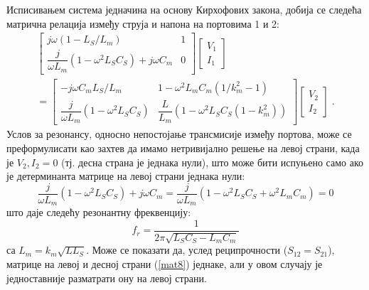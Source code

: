 \documentclass[main.tex]{subfiles}
\begin{document}
Исписивањем система једначина на основу Кирхофових закона, добија се следећа матрична релација између струја и напона на портовима 1 и 2:
\begin{multline}\label{mat8}
\begin{bmatrix}
j\omega (1-L_S/L_m) & 1 \\
\dfrac{j}{\omega L_m}(1-\omega^2 L_S C_S) + j\omega C_m & 0
\end{bmatrix}
\begin{bmatrix} V_1 \\ I_1 \end{bmatrix}  \\  = 
\begin{bmatrix}
-j\omega C_m L_S/L_m & 1 - \omega^2 L_m C_m (1/k_m^2 -1) \\
\dfrac{j}{\omega L_m}(1-\omega^2 L_S C_S) & \dfrac{L}{L_m}(1-\omega^2 L_S C_S(1-k_m^2))
\end{bmatrix}
\begin{bmatrix} V_2 \\ I_2 \end{bmatrix}\;.
\end{multline}
Услов за резонансу, односно непостојање трансмисије између портова, може се преформулисати као захтев да имамо нетривијално решење на левој страни, када је $V_2,I_2=0$ (тј. десна страна је једнака нули), што може бити испуњено само ако је детерминанта матрице на левој страни једнака нули:
\begin{equation}
\frac{j}{\omega L_m}(1-\omega^2 L_S C_S) + j\omega C_m
= \frac{j}{\omega L_m}(1-\omega^2 L_S C_S+\omega^2 L_m C_m)=0
\end{equation}
што даје следећу резонантну фреквенцију:
\begin{equation}
f_r = \frac{1}{2\pi\sqrt{L_S C_S - L_mC_m}} 
\end{equation}
са $L_m=k_m\sqrt{LL_S}$. 
Може се показати да, услед реципрочности ($S_{12}=S_{21}$), матрице на левој и десној страни (\ref{mat8}) једнаке, али у овом случају је једноставније разматрати ону на левој страни.
\end{document}
